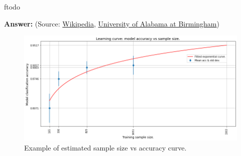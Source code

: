 ƒtodo\documentclass{article}
\newenvironment{QandA}{\begin{enumerate}[label=\arabic*.]}{\end{enumerate}}
\newenvironment{answer}{\par\normalfont \textbf{Answer:}}{}
\begin{document}
\begin{QandA}
\begin{answer}
        (Source: \href{https://en.wikipedia.org/wiki/Sample_complexity#Sample-complexity_bounds}{Wikipedia}, \href{https://sites.uab.edu/periop-datascience/2021/06/28/sample-size-in-machine-learning-and-artificial-intelligence/}{University of Alabama at Birmingham})
    \end{answer}

    \begin{figure}[htb!]
        \centering
        \includegraphics[width=0.9\columnwidth]{img/sample_size.png}
        \caption{Example of estimated sample size vs accuracy curve. \footnotemark }
        \label{fig:sample_size}
    \end{figure}



\end{QandA}
\end{document}
